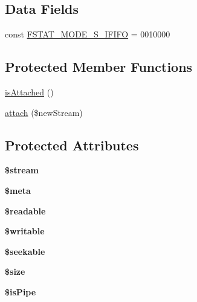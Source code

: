\subsection*{Data Fields}
\begin{DoxyCompactItemize}
\item 
const \mbox{\hyperlink{class_pes_1_1_http_1_1_stream_a657f63ddefe9966f042ecfaf214350a6}{F\+S\+T\+A\+T\+\_\+\+M\+O\+D\+E\+\_\+\+S\+\_\+\+I\+F\+I\+FO}} = 0010000
\end{DoxyCompactItemize}
\subsection*{Protected Member Functions}
\begin{DoxyCompactItemize}
\item 
\mbox{\hyperlink{class_pes_1_1_http_1_1_stream_a6e93873b04ab19cdf9827234a8d6d0de}{is\+Attached}} ()
\item 
\mbox{\hyperlink{class_pes_1_1_http_1_1_stream_a4db3051497ce0497bbb9a31a0f54e58d}{attach}} (\$new\+Stream)
\end{DoxyCompactItemize}
\subsection*{Protected Attributes}
\begin{DoxyCompactItemize}
\item 
\mbox{\label{class_pes_1_1_http_1_1_stream_aa658946a5d6cb700e35df1fc7854e7b3}} 
{\bfseries \$stream}
\item 
\mbox{\label{class_pes_1_1_http_1_1_stream_a9e6fc1ae0498be7d1e682f8bcc9299df}} 
{\bfseries \$meta}
\item 
\mbox{\label{class_pes_1_1_http_1_1_stream_a03fff297e60e156d86156934149a22c6}} 
{\bfseries \$readable}
\item 
\mbox{\label{class_pes_1_1_http_1_1_stream_a0b21b8177e67b7dd1cb58c65f9604b72}} 
{\bfseries \$writable}
\item 
\mbox{\label{class_pes_1_1_http_1_1_stream_ab65802a57fae0f0d4887759f2f4bd997}} 
{\bfseries \$seekable}
\item 
\mbox{\label{class_pes_1_1_http_1_1_stream_af594986e4618a8d6a5d7566617f583c6}} 
{\bfseries \$size}
\item 
\mbox{\label{class_pes_1_1_http_1_1_stream_ac1bba07743b40396056135d621b8372b}} 
{\bfseries \$is\+Pipe}
\end{DoxyCompactItemize}
